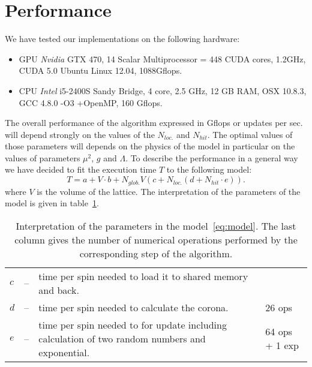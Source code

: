 \documentclass[a4paper]{llncs}
\begin{document}
\section{Performance}
\label{sec:performance}

We have tested our implementations on  the following hardware:
\begin{itemize}
\item GPU \emph{Nvidia} GTX 470, 14 Scalar Multiprocessor = 448 CUDA cores, 1.2GHz, CUDA 5.0 Ubuntu Linux 12.04, 1088Gflops.
\item CPU \emph{Intel} i5-2400S Sandy Bridge, 4 core, 2.5 GHz, 12 GB RAM, OSX 10.8.3, GCC 4.8.0 -O3 +OpenMP, 160 Gflops. 
\end{itemize}

The overall performance of the algorithm expressed in Gflops or
updates per sec. will depend strongly on the values of the $N_{loc.}$
and $N_{hit}$. The optimal values of those parameters will depends on
the physics of the model in particular on the values of parameters
$\mu^2$, $g$ and $\Lambda$. To describe the performance in a general
way we have decided to fit the execution time $T$ to the following
model:
\begin{equation}\label{eq:model}
T  = a+ V \cdot b +
N_{glob.} V \left(c + N_{loc.}\left(d + N_{hit}\cdot e\right)\right) . 
\end{equation}
where $V$ is the volume of the lattice.  The interpretation of the
parameters of the model is given in table~\ref{tab:pars-int}.

\begin{table}
\begin{center} \begin{tabular}{lcp{8cm}p{2cm}}
$c$ &--& time per spin needed to load it to shared memory and back.&\\
$d$ &--& time per spin needed to calculate the corona.& 26 ops\\
$e$ &--& time per spin needed to for update including calculation of two
random numbers and exponential. & 64 ops + 1 exp
\end{tabular}
\end{center}
\caption{\label{tab:pars-int}Interpretation of the parameters in the
model~\ref{eq:model}. The last column gives the number of numerical operations
performed by the corresponding step of the algorithm.}
\end{table}
\end{document}
